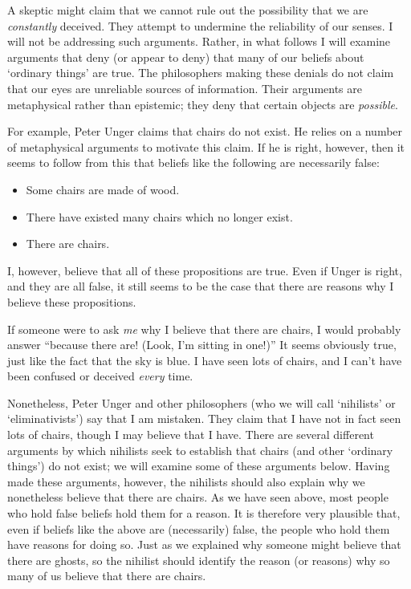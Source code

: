 \documentclass[11pt]{standalone}
\begin{document}
\begin{spacing}{1.5}
A skeptic might claim that we cannot rule out the possibility that we
are {\em constantly} deceived.  They attempt to undermine the
reliability of our senses.  I will not be addressing such arguments.
Rather, in what follows I will examine arguments that deny (or appear
to deny) that many of our beliefs about `ordinary things' are true.
The philosophers making these denials do not claim that our eyes are
unreliable sources of information.  Their arguments are metaphysical
rather than epistemic; they deny that certain objects are {\em
  possible}.  

For example, Peter Unger claims that chairs do not exist.  He relies
on a number of metaphysical arguments to motivate this claim.  If he
is right, however, then it seems to follow from this that beliefs like
the following are necessarily false:

\begin{itemize}
  \item Some chairs are made of wood.
  \item There have existed many chairs which no longer exist.
  \item There are chairs.
\end{itemize}

I, however, believe that all of these propositions are true.  Even if
Unger is right, and they are all false, it still seems to be the case
that there are reasons why I believe these propositions.

If someone were to ask {\em me} why I believe that there are chairs, I
would probably answer ``because there are!  (Look, I'm sitting in
one!)''  It seems obviously true, just like the fact that the sky is
blue.  I have seen lots of chairs, and I can't have been confused or
deceived {\em every} time.

Nonetheless, Peter Unger and other philosophers (who we will call
`nihilists' or `eliminativists') say that I am mistaken.  They claim
that I have not in fact seen lots of chairs, though I may believe that
I have.  There are several different arguments by which nihilists seek
to establish that chairs (and other `ordinary things') do not exist;
we will examine some of these arguments below.  Having made these
arguments, however, the nihilists should also explain why we
nonetheless believe that there are chairs.  As we have seen above,
most people who hold false beliefs hold them for a reason.  It is
therefore very plausible that, even if beliefs like the above are
(necessarily) false, the people who hold them have reasons for doing
so.  Just as we explained why someone might believe that there are
ghosts, so the nihilist should identify the reason (or reasons) why so
many of us believe that there are chairs.


\end{spacing}
\end{document}
